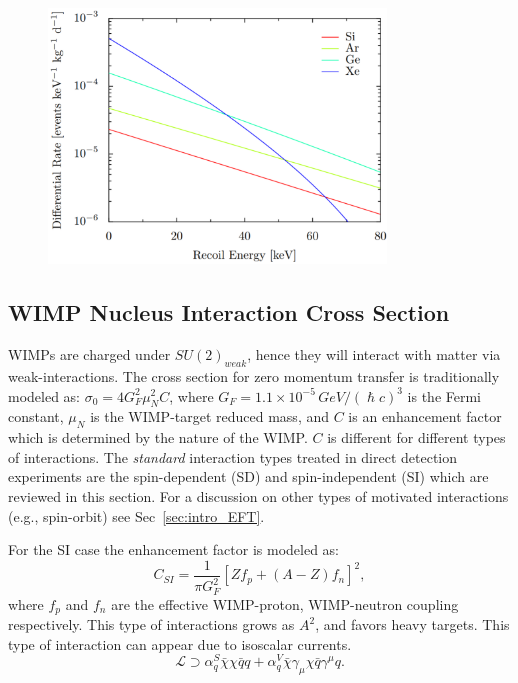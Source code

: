 \begin{figure}[t!]
	\centering
	\includegraphics[width=0.8\textwidth]{figs/EventRate.png}
	\label{fig:interactionRate}
\end{figure}



\subsection{WIMP Nucleus Interaction Cross Section}
\label{subsubsec:WIMP_CS}

WIMPs are charged under $SU(2)_{weak}$, hence they will interact with matter via weak-interactions. The cross section for zero momentum transfer is traditionally modeled as: $\sigma_0 = 4G^2_F\mu_N^2C$, where $G_F = 1.1\times 10^{-5}\,GeV/(\hslash c)^3$ is the Fermi constant, $\mu_N$ is the WIMP-target reduced mass, and $C$ is an enhancement factor which is determined by the nature of the WIMP. $C$ is different for different types of interactions. The \textit{standard} interaction types treated in direct detection experiments are the spin-dependent (SD) and spin-independent (SI) which are reviewed in this section. For a discussion on other types of motivated interactions (e.g., spin-orbit) see Sec~\ref{sec:intro_EFT}.

For the SI case the enhancement factor is modeled as:
\begin{equation}
C_{SI} = \frac{1}{\pi G_F^2}[Zf_p + (A-Z)f_n]^2,
\end{equation} 
where $f_p$ and $f_n$ are the effective WIMP-proton, WIMP-neutron coupling respectively. This type of interactions grows as $A^2$, and favors heavy targets. This type of interaction can appear due to isoscalar currents.
\begin{equation}
\mathcal{L} \supset \alpha_q^S \bar{\chi} \chi \bar{q}q + \alpha_q^V\bar{\chi}\gamma_\mu\chi\bar{q}\gamma^\mu q.  
\end{equation}

